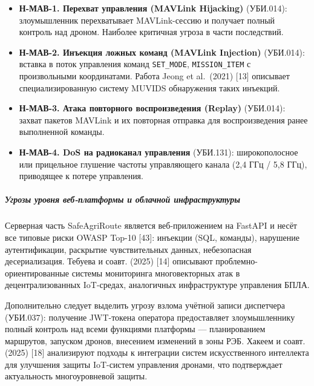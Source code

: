 \begin{itemize}
\tightlist
\item
  \textbf{Н-МАВ-1. Перехват управления (MAVLink Hijacking)} (УБИ.014): злоумышленник перехватывает MAVLink-сессию и получает полный контроль над дроном. Наиболее критичная угроза в части последствий.
\item
  \textbf{Н-МАВ-2. Инъекция ложных команд (MAVLink Injection)} (УБИ.014): вставка в поток управления команд \texttt{SET\_MODE}, \texttt{MISSION\_ITEM} с произвольными координатами. Работа Jeong et al.~(2021) {[}13{]} описывает специализированную систему MUVIDS обнаружения таких инъекций.
\item
  \textbf{Н-МАВ-3. Атака повторного воспроизведения (Replay)} (УБИ.014): захват пакетов MAVLink и их повторная отправка для воспроизведения ранее выполненной команды.
\item
  \textbf{Н-МАВ-4. DoS на радиоканал управления} (УБИ.131): широкополосное или прицельное глушение частоты управляющего канала (2,4 ГГц / 5,8 ГГц), приводящее к потере управления.
\end{itemize}

\hypertarget{ux443ux433ux440ux43eux437ux44b-ux443ux440ux43eux432ux43dux44f-ux432ux435ux431-ux43fux43bux430ux442ux444ux43eux440ux43cux44b-ux438-ux43eux431ux43bux430ux447ux43dux43eux439-ux438ux43dux444ux440ux430ux441ux442ux440ux443ux43aux442ux443ux440ux44b}{%
\subparagraph{Угрозы уровня веб-платформы и облачной инфраструктуры}\label{ux443ux433ux440ux43eux437ux44b-ux443ux440ux43eux432ux43dux44f-ux432ux435ux431-ux43fux43bux430ux442ux444ux43eux440ux43cux44b-ux438-ux43eux431ux43bux430ux447ux43dux43eux439-ux438ux43dux444ux440ux430ux441ux442ux440ux443ux43aux442ux443ux440ux44b}}

Серверная часть SafeAgriRoute является веб-приложением на FastAPI и несёт все типовые риски OWASP Top-10 {[}43{]}: инъекции (SQL, команды), нарушение аутентификации, раскрытие чувствительных данных, небезопасная десериализация. Тебуева и соавт. (2025) {[}14{]} описывают проблемно-ориентированные системы мониторинга многовекторных атак в децентрализованных IoT-средах, аналогичных инфраструктуре управления БПЛА.

Дополнительно следует выделить угрозу взлома учётной записи диспетчера (УБИ.037): получение JWT-токена оператора предоставляет злоумышленнику полный контроль над всеми функциями платформы --- планированием маршрутов, запуском дронов, внесением изменений в зоны РЭБ. Хакеем и соавт. (2025) {[}18{]} анализируют подходы к интеграции систем искусственного интеллекта для улучшения защиты IoT-систем управления дронами, что подтверждает актуальность многоуровневой защиты.

